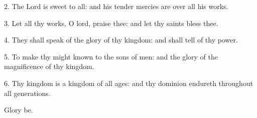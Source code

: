 
2. The Lord is sweet to all: and his tender mercies are over all his works.

3. Let all thy works, O lord, praise thee: and let thy saints bless thee.

4. They shall speak of the glory of thy kingdom: and shall tell of thy power.

5. To make thy might known to the sons of men: and the glory of the magnificence of thy kingdom.

6. Thy kingdom is a kingdom of all ages: and thy dominion endureth throughout all generations.

Glory be.
